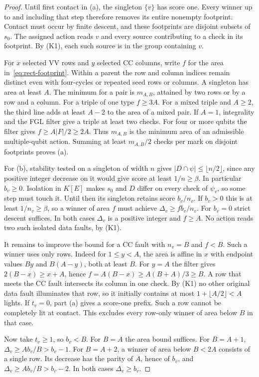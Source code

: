 \documentclass[10pt,twocolumn]{article}
\theoremstyle{definition}
\begin{document}
\begin{proof}
Until first contact in (a), the singleton $\{v\}$ has score one.
Every winner up to and including that step therefore removes its
entire nonempty footprint. Contact must occur by finite descent, and
these footprints are disjoint subsets of $s_0$. The assigned action
reads $v$ and every source contributing to a check in its footprint.
By (K1), each such source is in the group containing $v$.

For $x$ selected VV rows and $y$ selected CC columns, write $f$
for the area in~\eqref{eq:rect-footprint}. Within a parent the row
and column indices remain distinct even with four-cycles or repeated
seed rows or columns. A singleton has area at least $A$.
The minimum for a pair is $m_{A,B}$,
attained by two rows or by a row and a column. For a triple of one
type $f\ge3A$. For a mixed triple and $A\ge2$, the third line adds
at least $A-2$ to the area of a mixed pair. If $A=1$, integrality
and the FGL filter give a triple at least two checks. For four or
more qubits the filter gives $f\ge A|F|/2\ge2A$. Thus $m_{A,B}$ is
the minimum area of an admissible multiple-qubit action. Summing at
least $m_{A,B}/2$ checks per mark on disjoint footprints proves (a).

For (b), stability tested on a singleton of width $n$ gives
$|D\cap\psi|\le\lfloor n/2\rfloor$, since any positive integer
decrease on it would give score at least $1/n\ge\beta$.
In particular $b_v\ge0$. Isolation in $K[E]$ makes $s_0$ and $D$
differ on every check of $\psi_v$, so some step must touch it.
Until then its singleton retains score $b_v/n_v$. If $b_v>0$ this
is at least $1/n_v\ge\beta$, so a winner of area $f$ must achieve
$\Delta_v\ge f b_v/n_v$. For $b_v=0$ strict descent suffices.
In both cases $\Delta_v$ is a positive integer and $f\ge A$.
No action reads two such isolated data faults, by (K1).

It remains to improve the bound for a CC fault with $n_v=B$ and
$f<B$. Such a winner uses only rows. Indeed for $1\le y<A$, the area
is affine in $x$ with endpoint values $By$ and $B(A-y)$, both at least
$B$. For $y=A$ the filter gives $2(B-x)\ge x+A$, hence
$f=A(B-x)\ge A(B+A)/3\ge B$. A row that meets the CC fault
intersects its column in one check. By (K1) no other original data
fault illuminates that row, so it initially contains at most
$1+\lfloor A/2\rfloor<A$ lights. If $t_v=0$, part (a) gives a
score-one prefix. Such a row cannot be completely lit at contact.
This excludes every row-only winner of area below $B$ in that case.

Now take $t_v\ge1$, so $b_v<B$. For $B=A$ the area bound suffices.
For $B=A+1$, $\Delta_v\ge A b_v/B>b_v-1$. For $B=A+2$, a winner
of area below $B<2A$ consists of a single row. Its decrease has
the parity of $A$, hence of $b_v$, and $\Delta_v\ge A b_v/B>b_v-2$.
In both cases $\Delta_v\ge b_v$.
\end{proof}
\end{document}
